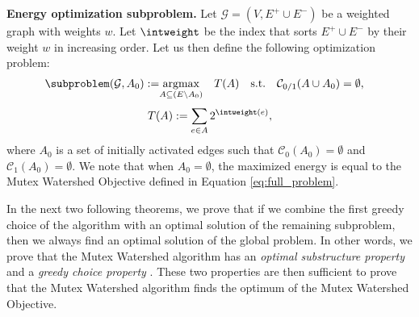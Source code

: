 \begin{definition} \label{def:general_MWS_obj}
\textbf{Energy optimization subproblem.}
Let $\mathcal{G} = (V, E^+ \cup E^-)$ be a weighted graph with weights $w$. Let $\intweight$ be the index that sorts $E^+ \cup E^-$ by their weight $w$ in increasing order.
Let us then define the following optimization problem:
\begin{align} \label{eq:general_MWS_obj}
  \subproblem(\mathcal{G},A_0) :=& \underset{A \subseteq (E \setminus A_0)}{\text{argmax}} \quad T(A) \quad \mathrm{ s.t. } \quad \mathcal{C}_{0/1}(A \cup A_0) = \emptyset,
\end{align}
\begin{equation}\label{eq:def_energy}
   T(A) := \sum_{e \in A} 2^{\intweight (e)},
\end{equation}
 where $A_0$ is a set of initially activated edges such that $\mathcal{C}_{0}(A_0) = \emptyset$ and $\mathcal{C}_{1}(A_0) = \emptyset$. We note that when $A_0 = \emptyset$, the maximized energy is equal to the Mutex Watershed Objective defined in Equation \ref{eq:full_problem}.
\end{definition}
\noindent In the next two following theorems, we prove that if we combine the first greedy choice of the algorithm with an optimal solution of the remaining subproblem, then we always find an optimal solution of the global problem.
In other words, we prove that the Mutex Watershed algorithm has an \emph{optimal substructure property} and a \emph{greedy choice property} \cite{cormen2009introduction}. 
These two properties are then sufficient to prove that the Mutex Watershed algorithm finds the optimum of the Mutex Watershed Objective.


